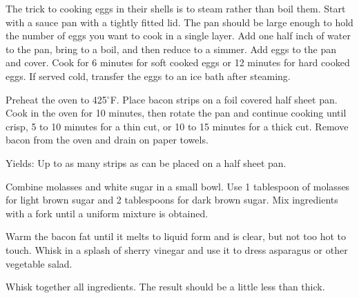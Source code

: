 \documentclass[letterpaper]{recipePMG}
\renewcommand{\deg}{$^\circ$}
\begin{document}
\label{SoftHardEggs}

The trick to cooking eggs in their shells is to steam rather than boil them. Start with a sauce pan with a tightly fitted lid. The pan should be large enough to hold the number of eggs you want to cook in a single layer.  Add one half inch of water to the pan, bring to a boil, and then reduce to a simmer.  Add eggs to the pan and cover.  Cook for 6 minutes for soft cooked eggs or 12 minutes for hard cooked eggs. If served cold, transfer the eggs to an ice bath after steaming.



Preheat the oven to 425\deg F. Place bacon strips on a foil covered half sheet pan. Cook in the oven for 10 minutes, then rotate the pan and continue cooking until crisp, 5 to 10 minutes for a thin cut, or 10 to 15 minutes for a thick cut. Remove bacon from the oven and drain on paper towels.

Yields: Up to as many strips as can be placed on a half sheet pan.



\label{BrownSugar}


Combine molasses and white sugar in a small bowl. Use 1 tablespoon of molasses for light brown sugar and 2 tablespoons for dark brown sugar. Mix ingredients with a fork until a uniform mixture is obtained.


\label{BaconFatVinaigrette}


Warm the bacon fat until it melts to liquid form and is clear, but not too hot to touch.  Whisk in a splash of sherry vinegar and use it to dress asparagus or other vegetable salad.



Whisk together all ingredients.  The result should be a little less than thick.
 
 
\end{document}
